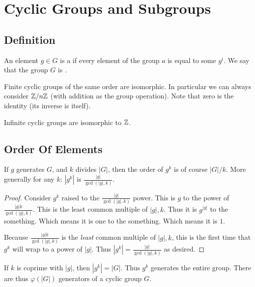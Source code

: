\section{Cyclic Groups and Subgroups}

\subsection{Definition}

\begin{definition}
  An element $g \in G$ is a  if every element of the
  group $a$ is equal to some $g^i$. We say that the group $G$ is
  .
\end{definition}

\begin{remark}
  Finite cyclic groups of the same order are isomorphic. In particular
  we can always consider $\mathbb{Z} / n\mathbb{Z}$ (with addition as the group
  operation). Note that zero is the identity (its inverse is itself).

  Infinite cyclic groups are isomorphic to $\mathbb{Z}$.
\end{remark}

\subsection{Order Of Elements}

\begin{proposition}
  If $g$ generates $G$, and $k$ divides $|G|$, then the order of $g^k$
  is of course $|G|/k$. More generally for any $k$: $|g^k|$ is
  $\frac{|g|}{\gcd(|g|, k)}$.
\end{proposition}

\begin{proof}
  Consider $g^k$ raised to the $\frac{|g|}{\gcd(|g|, k)}$ power. This is
  $g$ to the power of $\frac{|g|k}{\gcd(|g|, k)}$. This is the least
  common multiple of $|g|, k$. Thus it is $g^{|g|}$ to the something.
  Which means it is one to the something. Which means it is $1$.

  Because $\frac{|g|k}{\gcd(|g|, k)}$ is the \emph{least} common
  multiple of $|g|, k$, this is the first time that $g^k$ will wrap to a
  power of $|g|$. Thus $|g^k| = \frac{|g|}{\gcd(|g|, k)}$ as desired.
\end{proof}

\begin{remark}
  If $k$ is coprime with $|g|$, then $|g^k| = |G|$. Thus $g^k$ generates
  the entire group. There are thus $\varphi(|G|)$ generators of a cyclic
  group $G$.
\end{remark}

